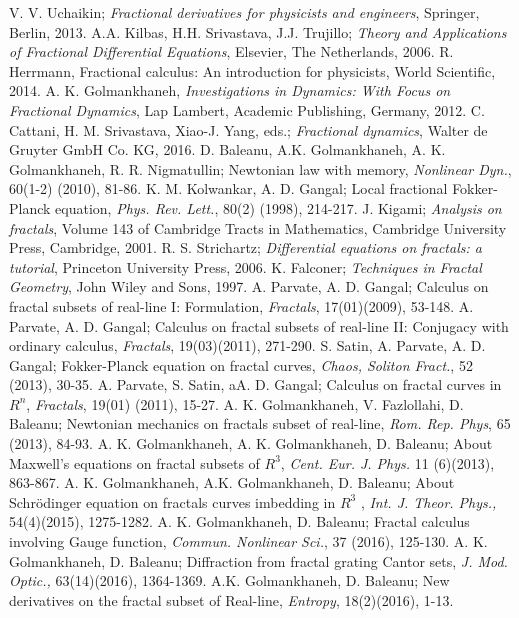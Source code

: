\documentclass[12pt]{article}
\begin{document}
\begin{thebibliography}{99}

 V. V.   Uchaikin; \emph{Fractional derivatives for physicists and engineers}, Springer, Berlin, 2013.
 A.A. Kilbas,  H.H. Srivastava, J.J. Trujillo; \emph{Theory and Applications of Fractional Differential Equations}, Elsevier, The Netherlands, 2006.
 R. Herrmann,  Fractional calculus: An introduction for physicists, World Scientific, 2014.
 A. K. Golmankhaneh, \emph{Investigations in Dynamics: With Focus on Fractional Dynamics}, Lap Lambert, Academic Publishing, Germany, 2012.
 C. Cattani,  H. M. Srivastava,  Xiao-J. Yang, eds.; \emph{Fractional dynamics}, Walter de Gruyter GmbH  Co. KG, 2016.
 D.  Baleanu, A.K. Golmankhaneh, A. K.  Golmankhaneh, R. R.  Nigmatullin; Newtonian law with memory,  \emph{Nonlinear Dyn.},  60(1-2) (2010), 81-86.
 K. M. Kolwankar,  A. D. Gangal; Local fractional Fokker-Planck equation, \emph{Phys. Rev. Lett.}, 80(2) (1998), 214-217.
J. Kigami; \emph{Analysis on fractals}, Volume 143 of Cambridge Tracts in Mathematics, Cambridge University Press, Cambridge, 2001.
 R. S. Strichartz; \emph{Differential equations on fractals: a tutorial}, Princeton University Press, 2006.
 K. Falconer;  \emph{Techniques in Fractal Geometry}, John Wiley and Sons, 1997.
 A.  Parvate, A. D.  Gangal; Calculus on fractal subsets of real-line I: Formulation, \emph{Fractals}, 17(01)(2009), 53-148.
   A.  Parvate, A. D.  Gangal; Calculus on fractal subsets of real-line II: Conjugacy with ordinary calculus, \emph{Fractals}, 19(03)(2011),  271-290.
 S.  Satin,  A. Parvate,  A. D. Gangal; Fokker-Planck equation on fractal curves,\emph{ Chaos, Soliton Fract.}, 52 (2013), 30-35.
   A. Parvate, S.   Satin, aA. D. Gangal; Calculus on fractal curves in $R^n$, \emph{Fractals}, 19(01) (2011), 15-27.
A. K. Golmankhaneh, V. Fazlollahi, D. Baleanu;  Newtonian mechanics on fractals subset of real-line, \emph{Rom. Rep. Phys}, 65 (2013), 84-93.
A. K.  Golmankhaneh, A. K. Golmankhaneh, D. Baleanu;   About Maxwell's equations on fractal subsets of $R^3$, \emph{Cent. Eur. J.  Phys.} 11 (6)(2013),  863-867.
A. K. Golmankhaneh, A.K.  Golmankhaneh, D.  Baleanu; About Schr\"{o}dinger equation on fractals curves imbedding in $R^3$ , \emph{Int. J.  Theor.  Phys.,} 54(4)(2015), 1275-1282.
A. K.  Golmankhaneh, D.  Baleanu; Fractal calculus involving Gauge function, \emph{Commun. Nonlinear Sci.}, 37 (2016), 125-130.
 A. K.  Golmankhaneh,  D. Baleanu; Diffraction from fractal grating Cantor sets, \emph{J. Mod. Optic.,}  63(14)(2016), 1364-1369.
A.K. Golmankhaneh, D. Baleanu; New derivatives on the fractal subset of Real-line, \emph{Entropy}, 18(2)(2016), 1-13.






\end{thebibliography}
\end{document}
